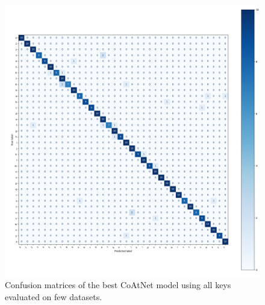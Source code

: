 \documentclass[a4paper,11pt,twoside]{report}
\theoremstyle{definition}
\begin{document}
\begin{figure}[H]
\begin{minipage}{0.49\linewidth}
  \end{minipage}
  \hfill
  \begin{minipage}{0.49\linewidth}
      \centering
      \includegraphics[width=\linewidth]{img_appendix/cm_all_all_p.png}
  \end{minipage}
  \caption{Confusion matrices of the best CoAtNet model using all keys evaluated on few datasets.}
\end{figure}

\end{document}
